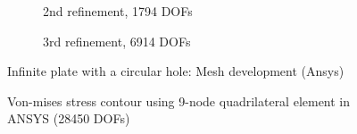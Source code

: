 \begin{figure}[h!]
\begin{subfigure}[b]{0.48\linewidth}
{        }
        \caption{2nd refinement, 1794 DOFs}
    \end{subfigure}
    \begin{subfigure}[b]{0.48\linewidth}
        \centering
        \caption{3rd refinement, 6914 DOFs}
    \end{subfigure}
    \caption{Infinite plate with a circular hole: Mesh development (Ansys)}
    \label{adap_fig:ex_chole_mesh_ansys}
\end{figure}

\begin{figure}
    \centering
    \caption{Von-mises stress contour using 9-node quadrilateral element in ANSYS (28450 DOFs)}
    \label{adap_fig:ex_chole_stress_ansys}
\end{figure}